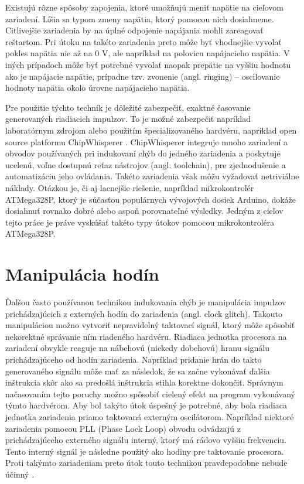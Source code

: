 Existujú rôzne spôsoby zapojenia, ktoré umožňujú meniť napätie na cieľovom zariadení. Líšia sa typom zmeny napätia, ktorý pomocou nich dosiahneme. Citlivejšie zariadenia by na úplné odpojenie napájania mohli zareagovať reštartom. Pri útoku na takéto zariadenia preto môže byť vhodnejšie vyvolať pokles napätia nie až na 0 V, ale napríklad na polovicu napájacieho napätia. V iných prípadoch môže byť potrebné vyvolať naopak prepätie na vyššiu hodnotu ako je napájacie napätie, prípadne tzv. zvonenie (angl. ringing) -- oscilovanie hodnoty napätia okolo úrovne napájacieho napätia.

Pre použitie týchto techník je dôležité zabezpečiť, exaktné časovanie generovaných riadiacich impulzov. To je možné zabezpečiť napríklad laboratórnym zdrojom alebo použitím špecializovaného hardvéru, napríklad open source platformu ChipWhisperer \cite{chipwhisperer}. ChipWhisperer integruje mnoho zariadení a obvodov používaných pri indukovaní chýb do jedného zariadenia a poskytuje ucelenú, voľne dostupnú reťaz nástrojov (angl. toolchain), pre zjednodušenie a automatizáciu jeho ovládania. Takéto zariadenia však môžu vyžadovať netriviálne náklady. Otázkou je, či aj lacnejšie riešenie, napríklad mikrokontrolér ATMega328P, ktorý je súčasťou populárnych vývojových dosiek Arduino, dokáže dosiahnuť rovnako dobré alebo aspoň porovnateľné výsledky. Jedným z cieľov tejto práce je práve vyskúšať takéto typy útokov pomocou mikrokontroléra ATMega328P.

\section{Manipulácia hodín}
Ďalšou často používanou technikou indukovania chýb je manipulácia impulzov prichádzajúcich z externých hodín do zariadenia (angl. clock glitch). Takouto manipuláciou možno vytvoriť nepravidelný taktovací signál, ktorý môže spôsobiť nekorektné správanie ním riadeného hardvéru. Riadiaca jednotka procesora na zariadení obvykle reaguje na nábehovú (niekedy dobehovú) hranu signálu prichádzajúceho od hodín zariadenia. Napríklad pridanie hrán do takto generovaného signálu môže mať za následok, že sa začne vykonávať ďalšia inštrukcia skôr ako sa predošlá inštrukcia stihla korektne dokončiť. Správnym načasovaním tejto poruchy možno spôsobiť cielený efekt na program vykonávaný týmto hardvérom. Aby bol takýto útok úspešný je potrebné, aby bola riadiaca jednotka zariadenia priamo taktovaná externým oscilátorom. Napríklad niektoré zariadenia pomocou PLL (Phase Lock Loop) obvodu odvádzajú z prichádzajúceho externého signálu interný, ktorý má rádovo vyššiu frekvenciu. Tento interný signál je následne použitý ako hodiny pre taktovanie procesora. Proti takýmto zariadeniam preto útok touto technikou pravdepodobne nebude účinný \cite{crowbars}.


